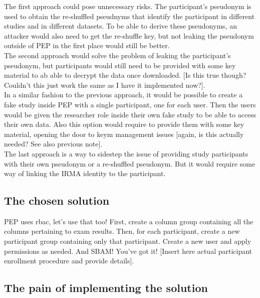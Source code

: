\documentclass{report}
\begin{document}
The first approach could pose unnecessary risks. The participant's pseudonym is used to obtain the re-shuffled pseudnyms that identify the participant in different studies and in
different datasets. To be able to derive these pseudonyms, an attacker would also need to get the re-shuffle key, but not leaking the pseudonym outside of PEP in the first place would still be
better. \\
The second approach would solve the problem of leaking the participant's pseudonym, but participants would still need to be provided with some key material to ab able to decrypt
the data once downloaded. [Is this true though? Couldn't this just work the same as I have it implemented now?]. \\
In a similar fashion to the previous approach, it would be possible to create a fake study inside PEP with a single participant, one for each user. Then the users would be given
the researcher role inside their own fake study to be able to access their own data. Also this option would require to provide them with some key material, opening the door to keym
management issues [again, is this actually needed? See also previous note]. \\
The last approach is a way to sidestep the issue of providing study participants with their own pseudonym or a re-shuffled pseudonym. But it would require some way of linking the
IRMA identity to the participant.\\

\subsection{The chosen solution}
PEP uses rbac, let's use that too! First, create a column group containing all the columns pertaining to exam results. Then, for each participant, create a new participant group
containing only that participant. Create a new user and apply permissions as needed. And SBAM! You've got it! [Insert here actual participant enrollment procedure and provide
details].
\subsection{The pain of implementing the solution}

\printbibliography
\end{document}
